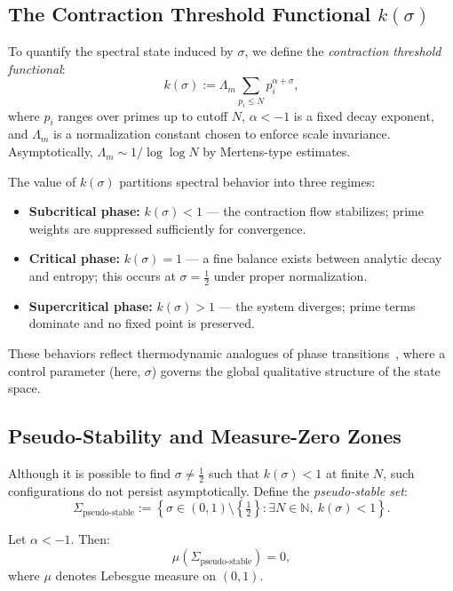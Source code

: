 \documentclass[12pt]{article}
\begin{document}
\subsection{The Contraction Threshold Functional $k(\sigma)$}

To quantify the spectral state induced by $\sigma$, we define the \emph{contraction threshold functional}:
\[
k(\sigma) := \Lambda_m \sum_{p_i \le N} p_i^{\alpha + \sigma},
\]
where $p_i$ ranges over primes up to cutoff $N$, $\alpha < -1$ is a fixed decay exponent, and $\Lambda_m$ is a normalization constant chosen to enforce scale invariance. Asymptotically, $\Lambda_m \sim 1/\log \log N$ by Mertens-type estimates.

The value of $k(\sigma)$ partitions spectral behavior into three regimes:
\begin{itemize}
    \item \textbf{Subcritical phase:} $k(\sigma) < 1$ — the contraction flow stabilizes; prime weights are suppressed sufficiently for convergence.
    \item \textbf{Critical phase:} $k(\sigma) = 1$ — a fine balance exists between analytic decay and entropy; this occurs at $\sigma = \tfrac{1}{2}$ under proper normalization.
    \item \textbf{Supercritical phase:} $k(\sigma) > 1$ — the system diverges; prime terms dominate and no fixed point is preserved.
\end{itemize}

These behaviors reflect thermodynamic analogues of phase transitions~\cite{ellis1985entropy}, where a control parameter (here, $\sigma$) governs the global qualitative structure of the state space.

\subsection{Pseudo-Stability and Measure-Zero Zones}

Although it is possible to find $\sigma \ne \tfrac{1}{2}$ such that $k(\sigma) < 1$ at finite $N$, such configurations do not persist asymptotically. Define the \emph{pseudo-stable set}:
\[
\Sigma_{\text{pseudo-stable}} := \left\{ \sigma \in (0,1) \setminus \left\{ \tfrac{1}{2} \right\} : \exists N \in \mathbb{N},\ k(\sigma) < 1 \right\}.
\]

\begin{lemma}
Let $\alpha < -1$. Then:
\[
\mu(\Sigma_{\text{pseudo-stable}}) = 0,
\]
where $\mu$ denotes Lebesgue measure on $(0,1)$.
\end{lemma}
\end{document}
